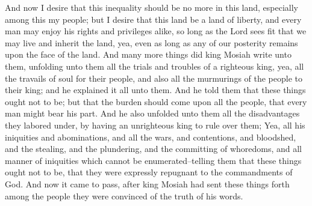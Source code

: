 And now I desire that this inequality should be no more in this land, especially among this my people; but I desire that this land be a land of liberty, and every man may enjoy his rights and privileges alike, so long as the Lord sees fit that we may live and inherit the land, yea, even as long as any of our posterity remains upon the face of the land.
\bverse \iffalse And many more things did king Mosiah write unto them, unfolding unto them all the trials and troubles of a righteous king, yea, all the travails of soul for their people, and also all the murmurings of the people to their king; and he explained it all unto them. \fi
And many more things did king Mosiah write unto them, unfolding unto them all the trials and troubles of a righteous king, yea, all the travails of soul for their people, and also all the murmurings of the people to their king; and he explained it all unto them.
\bverse \iffalse And he told them that these things ought not to be; but that the burden should come upon all the people, that every man might bear his part. \fi
And he told them that these things ought not to be; but that the burden should come upon all the people, that every man might bear his part.
\bverse \iffalse And he also unfolded unto them all the disadvantages they labored under, by having an unrighteous king to rule over them; \fi
And he also unfolded unto them all the disadvantages they labored under, by having an unrighteous king to rule over them;
\bverse \iffalse Yea, all his iniquities and abominations, and all the wars, and contentions, and bloodshed, and the stealing, and the plundering, and the committing of whoredoms, and all manner of iniquities which cannot be enumerated--telling them that these things ought not to be, that they were expressly repugnant to the commandments of God. \fi
Yea, all his iniquities and abominations, and all the wars, and contentions, and bloodshed, and the stealing, and the plundering, and the committing of whoredoms, and all manner of iniquities which cannot be enumerated--telling them that these things ought not to be, that they were expressly repugnant to the commandments of God.
\bverse \iffalse And now it came to pass, after king Mosiah had sent these things forth among the people they were convinced of the truth of his words. \fi
And now it came to pass, after king Mosiah had sent these things forth among the people they were convinced of the truth of his words.
\bverse \iffalse Therefore they relinquished their desires for a king, and became exceedingly anxious that every man should have an equal chance throughout all the land; yea, and every man expressed a willingness to answer for his own sins. \fi
